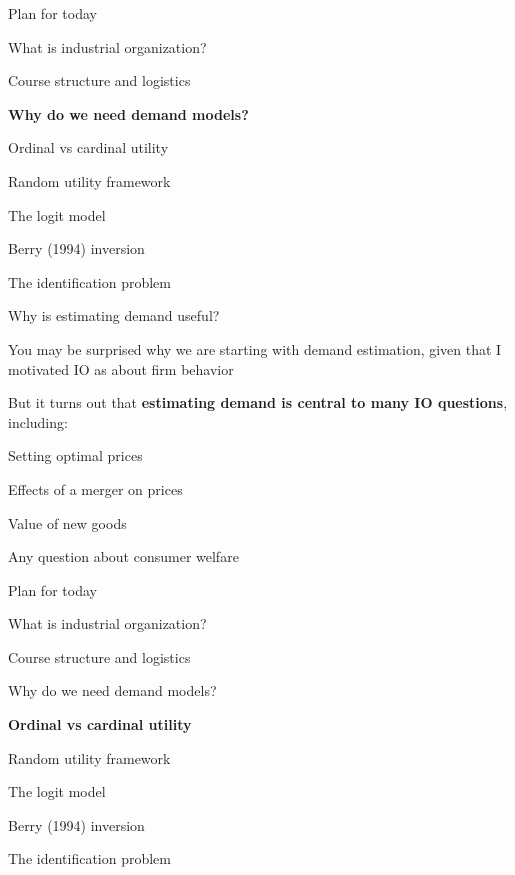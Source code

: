 \documentclass[notes,11pt, aspectratio=169]{beamer}
\newenvironment{wideitemize}{\itemize\addtolength{\itemsep}{10pt}}{\enditemize}
\newenvironment{wideenumerate}{\enumerate\addtolength{\itemsep}{10pt}}{\endenumerate}
\begin{document}

\begin{frame}{Plan for today}
  \begin{wideenumerate}
    \item What is industrial organization?
    \item Course structure and logistics
    \item \textbf{Why do we need demand models?}
    \item Ordinal vs cardinal utility
    \item Random utility framework
    \item The logit model
    \item Berry (1994) inversion
    \item The identification problem
  \end{wideenumerate}
\end{frame}

\begin{frame}{Why is estimating demand useful?}
	  \begin{wideitemize}
		\item You may be surprised why we are starting with demand estimation, given that I motivated IO as about firm behavior
		\item But it turns out that \textbf{estimating demand is central to many IO questions}, including:
		\begin{wideitemize}
		\item Setting optimal prices
		\item Effects of a merger on prices
		\item Value of new goods
		\item Any question about consumer welfare
		\end{wideitemize}
	\end{wideitemize}
\end{frame}

\begin{frame}{Plan for today}
  \begin{wideenumerate}
    \item What is industrial organization?
    \item Course structure and logistics
    \item Why do we need demand models?
    \item \textbf{Ordinal vs cardinal utility}
    \item Random utility framework
    \item The logit model
    \item Berry (1994) inversion
    \item The identification problem
  \end{wideenumerate}
\end{frame}
\end{document}
